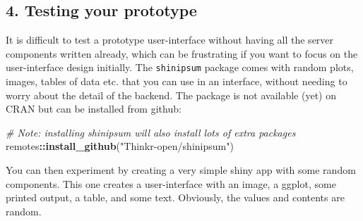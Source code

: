 \documentclass[]{article}
\newenvironment{Shaded}{\begin{snugshade}}{\end{snugshade}}
\newcommand{\KeywordTok}[1]{\textcolor[rgb]{0.13,0.29,0.53}{\textbf{#1}}}
\newcommand{\StringTok}[1]{\textcolor[rgb]{0.31,0.60,0.02}{#1}}
\newcommand{\CommentTok}[1]{\textcolor[rgb]{0.56,0.35,0.01}{\textit{#1}}}
\newcommand{\OperatorTok}[1]{\textcolor[rgb]{0.81,0.36,0.00}{\textbf{#1}}}
\newcommand{\NormalTok}[1]{#1}
\begin{document}
\subsection{4. Testing your prototype}\label{testing-your-prototype}

It is difficult to test a prototype user-interface without having all
the server components written already, which can be frustrating if you
want to focus on the user-interface design initially. The
\texttt{shinipsum} package comes with random plots, images, tables of
data etc. that you can use in an interface, without needing to worry
about the detail of the backend. The package is not available (yet) on
CRAN but can be installed from github:

\begin{Shaded}
\begin{Highlighting}[]
\CommentTok{# Note: installing shinipsum will also install lots of extra packages}
\NormalTok{remotes}\OperatorTok{::}\KeywordTok{install_github}\NormalTok{(}\StringTok{"Thinkr-open/shinipsum"}\NormalTok{)}
\end{Highlighting}
\end{Shaded}

You can then experiment by creating a very simple shiny app with some
random components. This one creates a user-interface with an image, a
ggplot, some printed output, a table, and some text. Obviously, the
values and contents are random.
\end{document}
